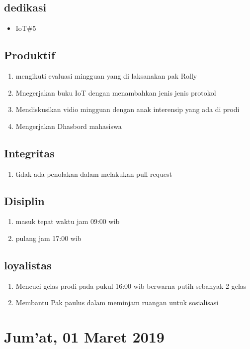 \subsection{dedikasi}
\begin{itemize}
  \item IoT\#5
\end{itemize}
\subsection{Produktif}
\begin{enumerate}
  \item mengikuti evaluasi mingguan yang di laksanakan pak Rolly
  \item Mnegerjakan buku IoT dengan menambahkan jenis jenis protokol
  \item Mendiskusikan vidio mingguan dengan anak interensip yang ada di prodi
  \item Mengerjakan Dhasbord mahasiswa
\end{enumerate}
\subsection{Integritas}
\begin{enumerate}
  \item tidak ada penolakan dalam melakukan pull request
\end{enumerate}
\subsection{Disiplin}
\begin{enumerate}
  \item masuk tepat waktu jam 09:00 wib
  \item pulang jam 17:00 wib
\end{enumerate}
\subsection{loyalistas}
\begin{enumerate}
  \item Mencuci gelas prodi pada pukul 16:00 wib berwarna putih sebanyak 2 gelas
  \item Membantu Pak paulus dalam meminjam ruangan untuk sosialisasi
\end{enumerate}

\section{Jum'at, 01 Maret 2019}
